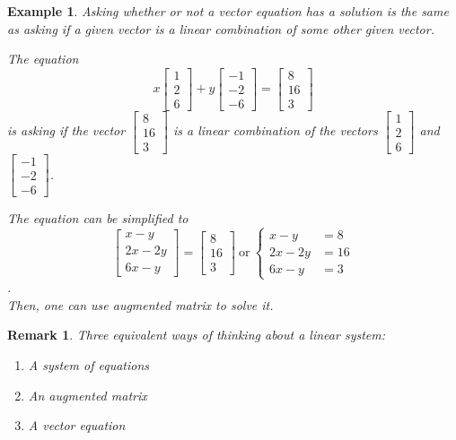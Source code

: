 \documentclass[12pt, a4paper]{article}
\newtheorem{eg}{Example}[subsection]
\newtheorem*{rmk}{\indent Remark}
\begin{document}
\begin{eg}
Asking whether or not a vector equation has a solution is the same as asking if a given vector is a linear combination of some other given vector. 

The equation 
$$x\begin{bmatrix}1\\2\\6\end{bmatrix}+y\begin{bmatrix}-1\\-2\\-6\end{bmatrix}=\begin{bmatrix}8\\16\\3\end{bmatrix}$$ 
is asking if the vector $\begin{bmatrix}8\\16\\3\end{bmatrix}$ is a linear combination of the vectors $\begin{bmatrix}1\\2\\6\end{bmatrix}$ and $\begin{bmatrix}-1\\-2\\-6\end{bmatrix}$. 

The equation can be simplified to 
$$\begin{bmatrix}x-y\\2x-2y\\6x-y\end{bmatrix}=\begin{bmatrix}8\\16\\3\end{bmatrix} \ \text{or}\ \left\{\begin{aligned}x-y&=8\\2x-2y&=16\\6x-y&=3\end{aligned}\right.$$.\\Then, one can use augmented matrix to solve it.
\end{eg}
\begin{rmk}Three equivalent ways of thinking about a linear system: 
\begin{enumerate}
\item A system of equations
\item An augmented matrix
\item A vector equation
\end{enumerate}
\end{rmk}
\end{document}
